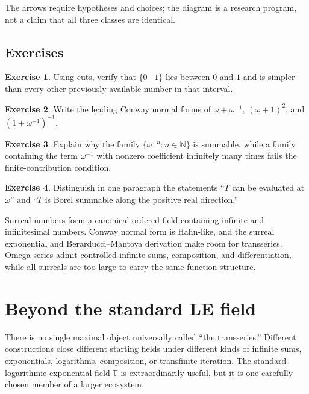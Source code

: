 \documentclass[11pt,openany]{book}
\theoremstyle{definition}
\newtheorem{exercise}{Exercise}[chapter]
\theoremstyle{plain}
\theoremstyle{remark}
\newcommand{\N}{\mathbb{N}}
\newcommand{\T}{\mathbb{T}}
\begin{document}
The arrows require hypotheses and choices; the diagram is a research program, not a claim that all three classes are identical.

\section{Exercises}

\begin{exercise}
Using cuts, verify that $\{0\mid1\}$ lies between $0$ and $1$ and is simpler than every other previously available number in that interval.
\end{exercise}

\begin{exercise}
Write the leading Conway normal forms of $\omega+\omega^{-1}$, $(\omega+1)^2$, and $(1+\omega^{-1})^{-1}$.
\end{exercise}

\begin{exercise}
Explain why the family $\{\omega^{-n}:n\in\N\}$ is summable, while a family containing the term $\omega^{-1}$ with nonzero coefficient infinitely many times fails the finite-contribution condition.
\end{exercise}

\begin{exercise}
Distinguish in one paragraph the statements ``$T$ can be evaluated at $\omega$'' and ``$T$ is Borel summable along the positive real direction.''
\end{exercise}

\begin{summarybox}
Surreal numbers form a canonical ordered field containing infinite and infinitesimal numbers. Conway normal form is Hahn-like, and the surreal exponential and Berarducci--Mantova derivation make room for transseries. Omega-series admit controlled infinite sums, composition, and differentiation, while all surreals are too large to carry the same function structure.
\end{summarybox}

\chapter{Beyond the standard LE field}\label{ch:beyond-LE}

There is no single maximal object universally called ``the transseries.'' Different constructions close different starting fields under different kinds of infinite sums, exponentials, logarithms, composition, or transfinite iteration. The standard logarithmic-exponential field $\T$ is extraordinarily useful, but it is one carefully chosen member of a larger ecosystem.
\end{document}
